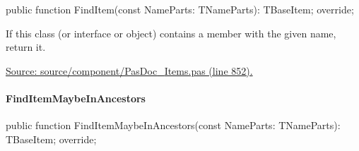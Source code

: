 \documentclass{report}
\newif\ifpdf
\begin{document}
\label{PasDoc_Items.TPasCio-FindItem}
\begin{list}{}{
\setlength{\itemindent}{0cm}
\setlength{\listparindent}{0cm}
\setlength{\leftmargin}{\evensidemargin}
\addtolength{\leftmargin}{\tmplength}
\settowidth{\labelsep}{X}
\addtolength{\leftmargin}{\labelsep}
\setlength{\labelwidth}{\tmplength}
}
\item[\textbf{Declaration}\hfill]
\ifpdf
\begin{flushleft}
\fi
\begin{ttfamily}
public function FindItem(const NameParts: TNameParts): TBaseItem; override;\end{ttfamily}

\ifpdf
\end{flushleft}
\fi

\par
\item[\textbf{Description}]
If this class (or interface or object) contains a member with the given name, return it.\par
\href{https://github.com/pasdoc/pasdoc/blob/master/source/component/PasDoc_Items.pas#L852}{Source: source/component/PasDoc{\_}Items.pas (line 852).}

\end{list}
\paragraph*{FindItemMaybeInAncestors}\hspace*{\fill}

\label{PasDoc_Items.TPasCio-FindItemMaybeInAncestors}
\begin{list}{}{
\setlength{\itemindent}{0cm}
\setlength{\listparindent}{0cm}
\setlength{\leftmargin}{\evensidemargin}
\addtolength{\leftmargin}{\tmplength}
\settowidth{\labelsep}{X}
\addtolength{\leftmargin}{\labelsep}
\setlength{\labelwidth}{\tmplength}
}
\item[\textbf{Declaration}\hfill]
\ifpdf
\begin{flushleft}
\fi
\begin{ttfamily}
public function FindItemMaybeInAncestors(const NameParts: TNameParts): TBaseItem; override;\end{ttfamily}

\ifpdf
\end{flushleft}
\fi

\end{list}
\end{document}
